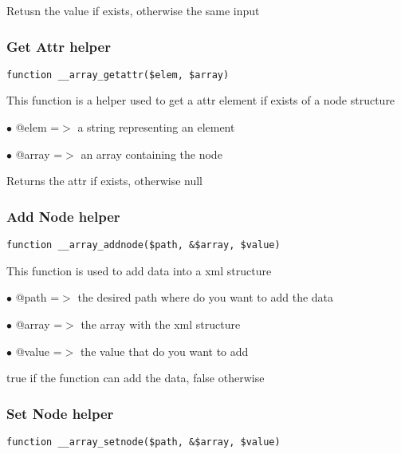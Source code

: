 \documentclass[a4paper]{article}
\begin{document}
Retusn the value if exists, otherwise the same input

\hypertarget{toc55}{}
\subsubsection{Get Attr helper}

\begin{lstlisting}
function __array_getattr($elem, $array)
\end{lstlisting}

This function is a helper used to get a attr element if exists of a node structure

\begin{compactitem}
\item[\color{myblue}$\bullet$] @elem  =$>$ a string representing an element
\item[\color{myblue}$\bullet$] @array =$>$ an array containing the node
\end{compactitem}

Returns the attr if exists, otherwise null

\hypertarget{toc56}{}
\subsubsection{Add Node helper}

\begin{lstlisting}
function __array_addnode($path, &$array, $value)
\end{lstlisting}

This function is used to add data into a xml structure

\begin{compactitem}
\item[\color{myblue}$\bullet$] @path  =$>$ the desired path where do you want to add the data
\item[\color{myblue}$\bullet$] @array =$>$ the array with the xml structure
\item[\color{myblue}$\bullet$] @value =$>$ the value that do you want to add
\end{compactitem}

true if the function can add the data, false otherwise

\hypertarget{toc57}{}
\subsubsection{Set Node helper}

\begin{lstlisting}
function __array_setnode($path, &$array, $value)
\end{lstlisting}
\end{document}
